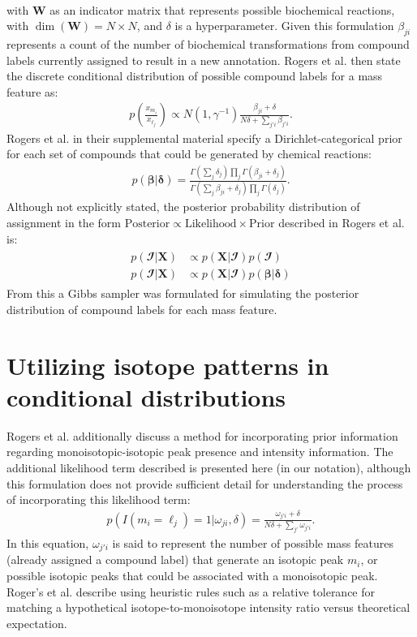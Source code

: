 \begin{DoubleSpace*}
\begin{align}
\end{align}
with $\textbf{W}$ as an indicator matrix that represents possible biochemical reactions, with $\dim(\textbf{W})=N\times N$, and $\delta$ is a hyperparameter. Given this formulation $\beta_{ji}$ represents a count of the number of biochemical transformations from compound labels currently assigned to result in a new annotation. Rogers et al. then state the discrete conditional distribution of possible compound labels for a mass feature as:
\begin{align}
	p\left(\frac{x_{m_i}}{x_{\ell_j}}\right) \propto N(1, \gamma^{-1})  \frac{\beta_{ji}+\delta}{N\delta+\sum_{j'i} \beta_{j'i}}.
\end{align}
Rogers et al. in their supplemental material specify a Dirichlet-categorical prior for each set of compounds that could be generated by chemical reactions:
\begin{align}
	p(\boldsymbol{\beta}|\boldsymbol{\delta})=\frac{\Gamma(\sum_j \delta_j) \prod_j \Gamma(\beta_{ji}+\delta_j)}{\Gamma(\sum_j \beta_{ji}+\delta_j) \prod_j \Gamma(\delta_j)}.
\end{align}
Although not explicitly stated, the posterior probability distribution of assignment in the form $\text{Posterior} \propto \text{Likelihood} \times \text{Prior}$ described in Rogers et al. is:
\begin{align}
\begin{split}
p( \mathbfcal{I}|\textbf{X}) &\propto p(\textbf{X}| \mathbfcal{I}) p( \mathbfcal{I}) \\
p( \mathbfcal{I}|\textbf{X}) &\propto p(\textbf{X}| \mathbfcal{I}) p(\boldsymbol{\beta}|\boldsymbol{\delta})
\end{split}
\end{align}
From this a Gibbs sampler was formulated for simulating the posterior distribution of compound labels for each mass feature. 

\section{Utilizing isotope patterns in conditional distributions}
Rogers et al. \cite{rogers2009} additionally discuss a method for incorporating prior information regarding monoisotopic-isotopic peak presence and intensity information. The additional likelihood term described is presented here (in our notation), although this formulation does not provide sufficient detail for understanding the process of incorporating this likelihood term:
\begin{align}
p( I(m_i=\ell_j )=1|\omega_{ji},\delta) = \frac{\omega_{j'i}+\delta}{N \delta + \sum_{j'}\omega_{j'i}}.
\end{align}
In this equation, $\omega_{j'i}$ is said to represent the number of possible mass features (already assigned a compound label) that generate an isotopic peak $m_i$, or possible isotopic peaks that could be associated with a monoisotopic peak. Roger's et al. describe using heuristic rules such as a relative tolerance for matching a hypothetical isotope-to-monoisotope intensity ratio versus theoretical expectation.


\end{DoubleSpace*}
